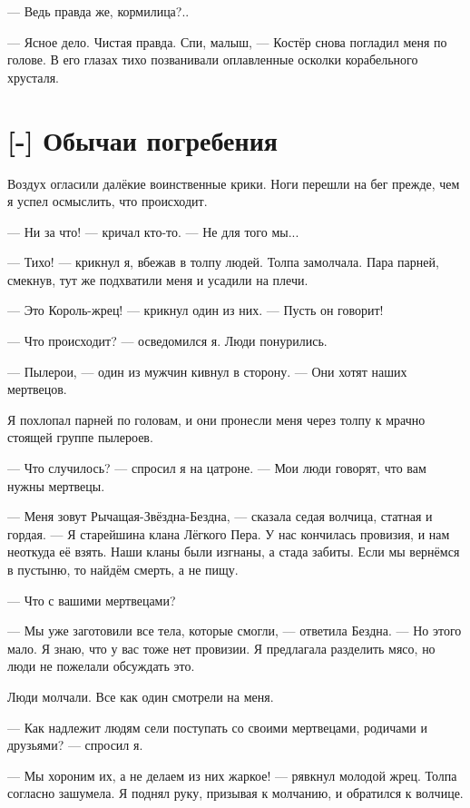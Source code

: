 --- Ведь правда же, кормилица?..

--- Ясное дело.
Чистая правда.
Спи, малыш, --- Костёр снова погладил меня по голове.
В его глазах тихо позванивали оплавленные осколки корабельного хрусталя.

\section{[-] Обычаи погребения}

\textspace

Воздух огласили далёкие воинственные крики.
Ноги перешли на бег прежде, чем я успел осмыслить, что происходит.

--- Ни за что! --- кричал кто-то.
--- Не для того мы...

--- Тихо! --- крикнул я, вбежав в толпу людей.
Толпа замолчала.
Пара парней, смекнув, тут же подхватили меня и усадили на плечи.

--- Это Король-жрец! --- крикнул один из них.
--- Пусть он говорит!

--- Что происходит? --- осведомился я.
Люди понурились.

--- Пылерои, --- один из мужчин кивнул в сторону.
--- Они хотят наших мертвецов.

Я похлопал парней по головам, и они пронесли меня через толпу к мрачно стоящей группе пылероев.

--- Что случилось? --- спросил я на цатроне.
--- Мои люди говорят, что вам нужны мертвецы.

--- Меня зовут Рычащая-Звёздна-Бездна, --- сказала седая волчица, статная и гордая.
--- Я старейшина клана Лёгкого Пера.
У нас кончилась провизия, и нам неоткуда её взять.
Наши кланы были изгнаны, а стада забиты.
Если мы вернёмся в пустыню, то найдём смерть, а не пищу.

--- Что с вашими мертвецами?

--- Мы уже заготовили все тела, которые смогли, --- ответила Бездна.
--- Но этого мало.
Я знаю, что у вас тоже нет провизии.
Я предлагала разделить мясо, но люди не пожелали обсуждать это.

Люди молчали.
Все как один смотрели на меня.

--- Как надлежит людям сели поступать со своими мертвецами, родичами и друзьями? --- спросил я.

--- Мы хороним их, а не делаем из них жаркое! --- рявкнул молодой жрец.
Толпа согласно зашумела.
Я поднял руку, призывая к молчанию, и обратился к волчице.

